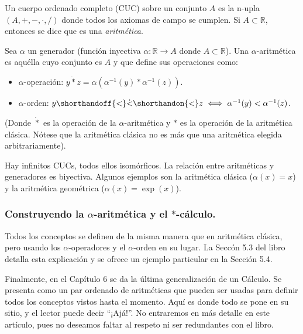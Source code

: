 Un cuerpo ordenado completo (CUC) sobre un conjunto $A$ es la n-upla $(A, +, -, \cdot, /)$ donde todos los axiomas de campo se cumplen. Si $A \subset \mathbb{R}$, entonces se dice que es una \textit{aritmética}.

Sea $\alpha$ un generador (función inyectiva $\alpha: \mathbb{R} \to A$ donde $A \subset \mathbb{R}$). Una $\alpha$-aritmética es aquélla cuyo conjunto es $A$ y que define sus operaciones como:

\newcommand{\lessdot}{\shorthandoff{<}\dot{<}\shorthandon{<}}

\begin{otherlanguage}{english}
\begin{itemize}
	\item $\alpha$-operación: $y \dot{*} z = \alpha(\alpha^{-1}(y) * \alpha^{-1}(z))$.
	\item $\alpha$-orden: $y \lessdot z \iff \alpha^{-1}(y) < \alpha^{-1}(z)$.
\end{itemize}
\end{otherlanguage}

(Donde $\dot{*}$ es la operación de la $\alpha$-aritmética y $*$ es la operación de la aritmética clásica. Nótese que la aritmética clásica no es más que una aritmética elegida arbitrariamente).

Hay infinitos CUCs, todos ellos isomórficos. La relación entre aritméticas y generadores es biyectiva. Algunos ejemplos son la aritmética clásica ($\alpha(x) = x$) y la aritmética geométrica ($\alpha(x) = \exp(x)$).

\subsubsection{Construyendo la $\alpha$-aritmética y el $*$-cálculo.}

Todos los conceptos se definen de la misma manera que en aritmética clásica, pero usando los $\alpha$-operadores y el $\alpha$-orden en su lugar. La Seccón 5.3 del libro detalla esta explicación y se ofrece un ejemplo particular en la Sección 5.4.

Finalmente, en el Capítulo 6 se da la última generalización de un Cálculo. Se presenta como un par ordenado de aritméticas que pueden ser usadas para definir todos los conceptos vistos hasta el momento. Aquí es donde todo se pone en su sitio, y el lector puede decir \enquote{¡Ajá!}. No entraremos en más detalle en este artículo, pues no deseamos faltar al respeto ni ser redundantes con el libro.
